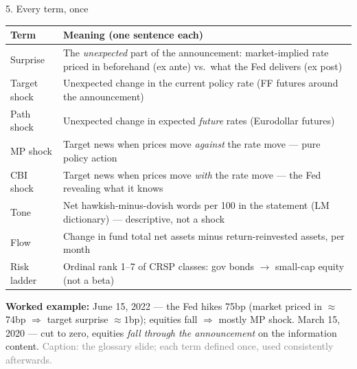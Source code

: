 \documentclass[aspectratio=169, 11pt]{beamer}
\begin{document}
\begin{frame}{5. Every term, once}
  \footnotesize
  \begin{tabularx}{\textwidth}{l X}
    \toprule
    \textbf{Term} & \textbf{Meaning (one sentence each)} \\
    \midrule
    Surprise & The \emph{unexpected} part of the announcement: market-implied rate priced in beforehand (ex ante) vs.\ what the Fed delivers (ex post) \\
    Target shock & Unexpected change in the current policy rate (FF futures around the announcement) \\
    Path shock & Unexpected change in expected \emph{future} rates (Eurodollar futures) \\
    MP shock & Target news when prices move \emph{against} the rate move --- pure policy action \\
    CBI shock & Target news when prices move \emph{with} the rate move --- the Fed revealing what it knows \\
    Tone & Net hawkish-minus-dovish words per 100 in the statement (LM dictionary) --- descriptive, not a shock \\
    Flow & Change in fund total net assets minus return-reinvested assets, per month \\
    Risk ladder & Ordinal rank 1--7 of CRSP classes: gov bonds $\to$ small-cap equity (not a beta) \\
    \bottomrule
  \end{tabularx}
  \vspace{0.3em}
  {\scriptsize \textbf{Worked example:} June 15, 2022 --- the Fed hikes 75bp (market priced in $\approx$ 74bp $\Rightarrow$ target surprise $\approx 1$bp);
  equities fall $\Rightarrow$ mostly MP shock. March 15, 2020 --- cut to zero, equities \emph{fall through the
  announcement} on the information content.}
  {\scriptsize\textcolor{gray}{Caption: the glossary slide; each term defined once, used consistently afterwards.}}
\end{frame}
\end{document}
